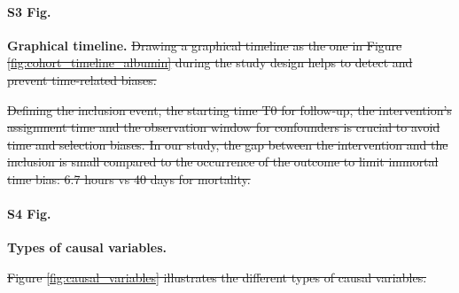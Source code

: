 \documentclass[10pt,letterpaper]{article}
\providecommand{\DIFdeltex}[1]{{\protect\color{red}\sout{#1}}}                      %
\providecommand{\DIFdelbegin}{} %
\providecommand{\DIFdelend}{} %
\providecommand{\DIFdelFL}[1]{\DIFdel{#1}} %
\providecommand{\DIFdel}[1]{\texorpdfstring{\DIFdeltex{#1}}{}} %
\newcommand{\DIFscaledelfig}{0.5}
\newlength{\DIFdelgraphicswidth} %
\newlength{\DIFdelgraphicsheight} %
\newcommand{\DIFdelincludegraphics}[2][]{%
\sbox{\DIFdelgraphicsbox}{\DIFOincludegraphics[#1]{#2}}%
\settoboxwidth{\DIFdelgraphicswidth}{\DIFdelgraphicsbox} %
\settoboxtotalheight{\DIFdelgraphicsheight}{\DIFdelgraphicsbox} %
\scalebox{\DIFscaledelfig}{%
\parbox[b]{\DIFdelgraphicswidth}{\usebox{\DIFdelgraphicsbox}\\[-\baselineskip] \rule{\DIFdelgraphicswidth}{0em}}\llap{\resizebox{\DIFdelgraphicswidth}{\DIFdelgraphicsheight}{%
\setlength{\unitlength}{\DIFdelgraphicswidth}%
\begin{picture}(1,1)%
\thicklines\linethickness{2pt} %
{\color[rgb]{1,0,0}\put(0,0){\framebox(1,1){}}}%
{\color[rgb]{1,0,0}\put(0,0){\line( 1,1){1}}}%
{\color[rgb]{1,0,0}\put(0,1){\line(1,-1){1}}}%
\end{picture}%
}\hspace*{3pt}}} %
} %
\DeclareRobustCommand{\DIFdelbegin}{\DIFOdelbegin \let\includegraphics\DIFdelincludegraphics} %
\DeclareRobustCommand{\DIFdelend}{\DIFOaddend \let\includegraphics\DIFOincludegraphics} %
\begin{document}
\DIFdelend \paragraph*{S3 Fig.}
\label{apd:graphical_timeline}
{\bf Graphical timeline.}
\DIFdelbegin \DIFdel{Drawing a graphical timeline as the one in Figure
  \ref{fig:cohort_timeline_albumin} during the study design helps to detect and
  prevent time-related biases.
}%

{%
  \DIFdelFL{Defining the inclusion event, the starting time T0 for follow-up, the
    intervention's assignment time and the observation window for confounders is
    crucial to avoid time and selection biases. In our study, the gap
    between the intervention and the inclusion is small
    compared to the occurrence of the outcome to limit immortal time bias: 6.7 hours vs 40
    days for mortality.}%
}
\DIFdelend

\paragraph*{S4 Fig.}
\label{apd:causal_variables}
{\bf Types of causal variables.}

\DIFdelbegin \DIFdel{Figure \ref{fig:causal_variables} illustrates the different types of causal variables.}%
\end{document}
